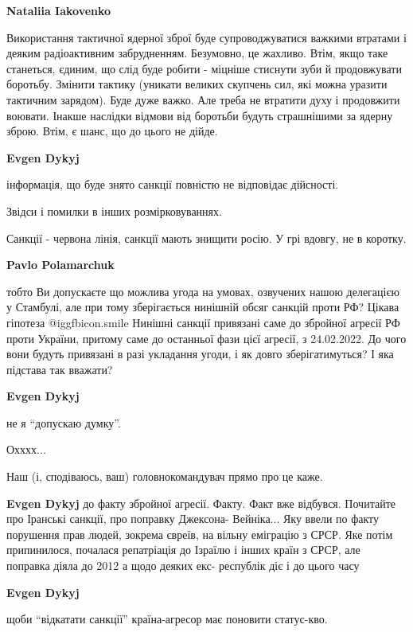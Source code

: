 \begin{itemize}
\begin{itemize}
\textbf{Nataliia Iakovenko} 

Використання тактичної ядерної зброї буде супроводжуватися важкими втратами і
деяким радіоактивним забрудненням. Безумовно, це жахливо. Втім, якщо таке
станеться, єдиним, що слід буде робити - міцніше стиснути зуби й продовжувати
боротьбу. Змінити тактику (уникати великих скупчень сил, які можна уразити
тактичним зарядом). Буде дуже важко. Але треба не втратити духу і продовжити
воювати. Інакше наслідки відмови від боротьби будуть страшнішими за ядерну
зброю. Втім, є шанс, що до цього не дійде.

\end{itemize} %

\textbf{Evgen Dykyj} 

інформація, що буде знято санкції повністю не відповідає дійсності.

Звідси і помилки в інших розмірковуваннях.

Санкції - червона лінія, санкції мають знищити росію. У грі вдовгу, не в
коротку.

\begin{itemize} %
\textbf{Pavlo Polamarchuk} 

тобто Ви допускаєте що можлива угода на умовах, озвучених нашою делегацією у
Стамбулі, але при тому зберігається нинішній обсяг санкцій проти РФ? Цікава
гіпотеза  @igg{fbicon.smile}  Нинішні санкції привязані саме до збройної агресії РФ проти
України, притому саме до останньої фази цієї агресії, з 24.02.2022. До чого
вони будуть привязані в разі укладання угоди, і як довго зберігатимуться? І яка
підстава так вважати?

\textbf{Evgen Dykyj} 

не я \enquote{допускаю думку}.

Охххх...

Наш (і, сподіваюсь, ваш) головнокомандувач прямо про це каже.

\textbf{Evgen Dykyj} до факту збройної агресії. Факту.
Факт вже відбувся.
Почитайте про Іранські санкції, про поправку Джексона- Вейніка...
Яку ввели по факту порушення прав людей, зокрема євреїв, на вільну еміграцію з СРСР.
Яке потім припинилося, почалася репатріація до Ізраїлю і інших країн з СРСР, але поправка діяла до 2012 а щодо деяких екс- республік діє і до цього часу

\textbf{Evgen Dykyj} 

щоби \enquote{відкатати санкції} країна-агресор має поновити статус-кво.


\end{itemize}
\end{itemize}
